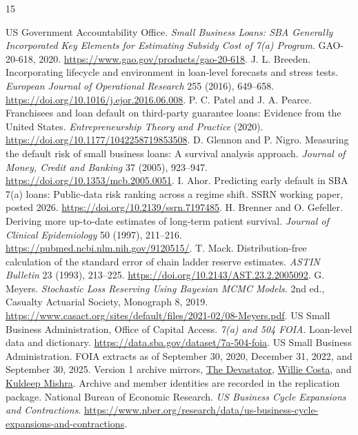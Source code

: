 \begin{thebibliography}{15}\small\raggedright\setlength{\itemsep}{2pt}
 US Government Accountability Office. \emph{Small Business Loans: SBA Generally Incorporated Key Elements for Estimating Subsidy Cost of 7(a) Program}. GAO-20-618, 2020. \url{https://www.gao.gov/products/gao-20-618}.
 J. L. Breeden. Incorporating lifecycle and environment in loan-level forecasts and stress tests. \emph{European Journal of Operational Research} 255 (2016), 649--658. \url{https://doi.org/10.1016/j.ejor.2016.06.008}.
 P. C. Patel and J. A. Pearce. Franchisees and loan default on third-party guarantee loans: Evidence from the United States. \emph{Entrepreneurship Theory and Practice} (2020). \url{https://doi.org/10.1177/1042258719853508}.
 D. Glennon and P. Nigro. Measuring the default risk of small business loans: A survival analysis approach. \emph{Journal of Money, Credit and Banking} 37 (2005), 923--947. \url{https://doi.org/10.1353/mcb.2005.0051}.
 I. Ahor. Predicting early default in SBA 7(a) loans: Public-data risk ranking across a regime shift. SSRN working paper, posted 2026. \url{https://doi.org/10.2139/ssrn.7197485}.
 H. Brenner and O. Gefeller. Deriving more up-to-date estimates of long-term patient survival. \emph{Journal of Clinical Epidemiology} 50 (1997), 211--216. \url{https://pubmed.ncbi.nlm.nih.gov/9120515/}.
 T. Mack. Distribution-free calculation of the standard error of chain ladder reserve estimates. \emph{ASTIN Bulletin} 23 (1993), 213--225. \url{https://doi.org/10.2143/AST.23.2.2005092}.
 G. Meyers. \emph{Stochastic Loss Reserving Using Bayesian MCMC Models}. 2nd ed., Casualty Actuarial Society, Monograph 8, 2019. \url{https://www.casact.org/sites/default/files/2021-02/08-Meyers.pdf}.
 US Small Business Administration, Office of Capital Access. \emph{7(a) and 504 FOIA}. Loan-level data and dictionary. \url{https://data.sba.gov/dataset/7a-504-foia}.
 US Small Business Administration. FOIA extracts as of September 30, 2020, December 31, 2022, and September 30, 2025. Version 1 archive mirrors,
\href{https://www.kaggle.com/datasets/thedevastator/sba-loan-guarantee-data-1990-1999}{The Devastator},
\href{https://www.kaggle.com/datasets/williecosta/sba-7a-loan-data}{Willie Costa}, and
\href{https://www.kaggle.com/datasets/kuldeepmishra0496/sba-loan-data}{Kuldeep Mishra}. Archive and member identities are recorded in the replication package.
 National Bureau of Economic Research. \emph{US Business Cycle Expansions and Contractions}. \url{https://www.nber.org/research/data/us-business-cycle-expansions-and-contractions}.

\end{thebibliography}
